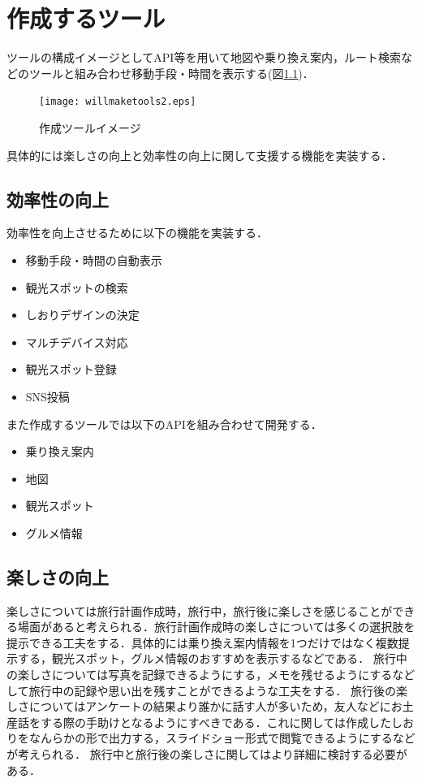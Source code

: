 \documentclass{funthesis}
\begin{document}
\chapter{作成するツール}%

ツールの構成イメージとしてAPI等を用いて地図や乗り換え案内，ルート検索などのツールと組み合わせ移動手段・時間を表示する(図\ref{Ltoolimg})．
\begin{figure}[htpb]
\begin{center}
\texttt{[image: willmaketools2.eps]}
\end{center}
\caption{作成ツールイメージ}
\label{Ltoolimg}
\end{figure}

具体的には楽しさの向上と効率性の向上に関して支援する機能を実装する．

\section{効率性の向上}
効率性を向上させるために以下の機能を実装する．
\begin{itemize}
 \item 移動手段・時間の自動表示
 \item 観光スポットの検索
 \item しおりデザインの決定
 \item マルチデバイス対応
 \item 観光スポット登録
  \item SNS投稿
\end{itemize}

また作成するツールでは以下のAPIを組み合わせて開発する．
\begin{itemize}
 \item 乗り換え案内
 \item 地図
 \item 観光スポット
 \item グルメ情報
\end{itemize}

\section{楽しさの向上}
楽しさについては旅行計画作成時，旅行中，旅行後に楽しさを感じることができる場面があると考えられる．旅行計画作成時の楽しさについては多くの選択肢を提示できる工夫をする．具体的には乗り換え案内情報を1つだけではなく複数提示する，観光スポット，グルメ情報のおすすめを表示するなどである．
旅行中の楽しさについては写真を記録できるようにする，メモを残せるようにするなどして旅行中の記録や思い出を残すことができるような工夫をする．%
旅行後の楽しさについてはアンケートの結果より誰かに話す人が多いため，友人などにお土産話をする際の手助けとなるようにすべきである．これに関しては作成したしおりをなんらかの形で出力する，スライドショー形式で閲覧できるようにするなどが考えられる．
旅行中と旅行後の楽しさに関してはより詳細に検討する必要がある．
\end{document}
